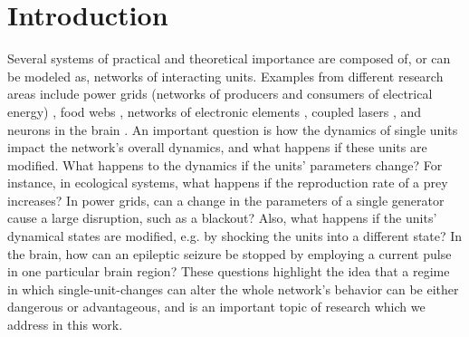  


\section{Introduction}\label{sec:intro}
Several systems of practical and theoretical importance are composed of, or can be modeled as, networks of interacting units. Examples from different research areas include power grids (networks of producers and consumers of electrical energy) \cite{motter2013spontaneous}, food webs \cite{dunne2002foodweb}, networks of electronic elements \cite{crotty2010josephson}, coupled lasers \cite{nixon2011synchronized}, and neurons in the brain \cite{varela2001brainweb}. An important question is how the dynamics of single units impact the network's overall dynamics, and what happens if these units are modified. What happens to the dynamics if the units' parameters change? For instance, in ecological systems, what happens if the reproduction rate of a prey increases? In power grids, can a change in the parameters of a single generator cause a large disruption, such as a blackout? Also, what happens if the units' dynamical states are modified, e.g. by shocking the units into a different state? In the brain, how can an epileptic seizure be stopped by employing a current pulse in one particular brain region? These questions highlight the idea that a regime in which single-unit-changes can alter the whole network's behavior can be either dangerous or advantageous, and is an important topic of research which we address in this work.

